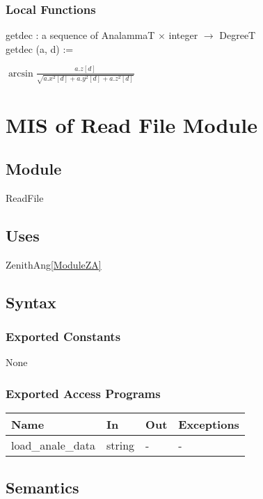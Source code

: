 \documentclass[12pt, titlepage]{article}
\begin{document}
\subsubsection{Local Functions}
getdec : a sequence of AnalammaT $\times$ integer $\rightarrow$ DegreeT\\
getdec (a, d) := 
\begin{center}\large
 $\arcsin \frac{a.z [ d ]}{ \sqrt{a.x^2 [ d ] + a.y^2 [ d ] + a.z^2 [ d ]}}$
\end{center}

\newpage

\section{MIS of Read File Module} \label{ModuleR} 

\subsection{Module}
ReadFile


\subsection{Uses}
ZenithAng\ref{ModuleZA}


\subsection{Syntax}

\subsubsection{Exported Constants}
None

\subsubsection{Exported Access Programs}

\begin{center}
\begin{tabular}{p{3cm} p{3cm} p{3cm} p{2cm}}
\hline
\textbf{Name} & \textbf{In} & \textbf{Out} & \textbf{Exceptions} \\
\hline 
load\_anale\_data & string & - & -\\


\hline
\end{tabular}
\end{center}


\subsection{Semantics}
\end{document}
